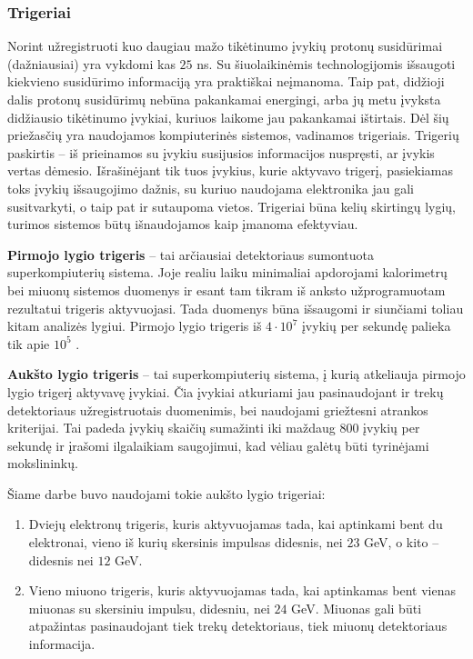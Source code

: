 \documentclass[a4paper, 12pt]{article}
\begin{document}
\subsubsection{Trigeriai}

Norint užregistruoti kuo daugiau mažo tikėtinumo įvykių protonų susidūrimai (dažniausiai) yra vykdomi kas
$25$ ns.
Su šiuolaikinėmis technologijomis išsaugoti kiekvieno susidūrimo informaciją yra praktiškai neįmanoma.
Taip pat, didžioji dalis protonų susidūrimų nebūna pakankamai energingi, arba jų metu įvyksta didžiausio
tikėtinumo įvykiai, kuriuos laikome jau pakankamai ištirtais.
Dėl šių priežasčių yra naudojamos kompiuterinės sistemos, vadinamos trigeriais.
Trigerių paskirtis -- iš prieinamos su įvykiu susijusios informacijos nuspręsti, ar įvykis vertas dėmesio.
Išrašinėjant tik tuos įvykius, kurie aktyvavo trigerį, pasiekiamas toks įvykių išsaugojimo dažnis, su kuriuo
naudojama elektronika jau gali susitvarkyti, o taip pat ir sutaupoma vietos.
Trigeriai būna kelių skirtingų lygių, turimos sistemos būtų išnaudojamos kaip įmanoma efektyviau.

\textbf{Pirmojo lygio trigeris} -- tai arčiausiai detektoriaus sumontuota superkompiuterių sistema.
Joje realiu laiku minimaliai apdorojami kalorimetrų bei miuonų sistemos duomenys ir esant tam tikram iš
anksto užprogramuotam rezultatui trigeris aktyvuojasi.
Tada duomenys būna išsaugomi ir siunčiami toliau kitam analizės lygiui.
Pirmojo lygio trigeris iš $4 \! \cdot \! 10^{7}$  įvykių per sekundę palieka tik apie $10^{5}$ \cite{HLtrigger}.

\textbf{Aukšto lygio trigeris} -- tai superkompiuterių sistema, į kurią atkeliauja pirmojo lygio trigerį
aktyvavę įvykiai.
Čia įvykiai atkuriami jau pasinaudojant ir trekų detektoriaus užregistruotais duomenimis, bei naudojami
griežtesni atrankos kriterijai.
Tai padeda įvykių skaičių sumažinti iki maždaug $800$ įvykių per sekundę ir įrašomi ilgalaikiam saugojimui,
kad vėliau galėtų būti tyrinėjami mokslininkų.

Šiame darbe buvo naudojami tokie aukšto lygio trigeriai:
\begin{enumerate}
\item Dviejų elektronų trigeris, kuris aktyvuojamas tada, kai aptinkami bent du elektronai, vieno iš kurių skersinis
impulsas didesnis, nei $23$ GeV, o kito -- didesnis nei $12$ GeV.
\item Vieno miuono trigeris, kuris aktyvuojamas tada, kai aptinkamas bent vienas miuonas su skersiniu impulsu,
didesniu, nei $24$ GeV. Miuonas gali būti atpažintas pasinaudojant tiek trekų detektoriaus, tiek miuonų
detektoriaus informacija.
\end{enumerate}
\end{document}
